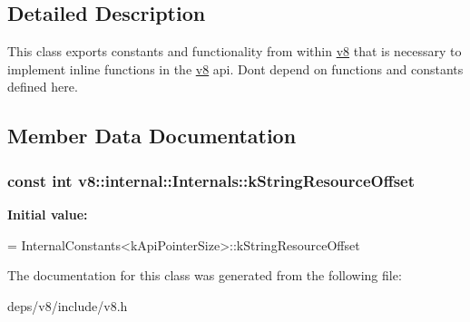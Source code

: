 \subsection{Detailed Description}
This class exports constants and functionality from within \hyperlink{namespacev8}{v8} that is necessary to implement inline functions in the \hyperlink{namespacev8}{v8} api. Don\textquotesingle{}t depend on functions and constants defined here. 

\subsection{Member Data Documentation}
\hypertarget{classv8_1_1internal_1_1_internals_a8c2b35069864f567ca0c571310dd90a1}{}
\subsubsection[{k\+String\+Resource\+Offset}]{\setlength{\rightskip}{0pt plus 5cm}const int v8\+::internal\+::\+Internals\+::k\+String\+Resource\+Offset\hspace{0.3cm}{\ttfamily [static]}}\label{classv8_1_1internal_1_1_internals_a8c2b35069864f567ca0c571310dd90a1}
{\bfseries Initial value\+:}
\begin{DoxyCode}
=
      InternalConstants<kApiPointerSize>::kStringResourceOffset
\end{DoxyCode}


The documentation for this class was generated from the following file\+:\begin{DoxyCompactItemize}
\item 
deps/v8/include/v8.\+h\end{DoxyCompactItemize}
